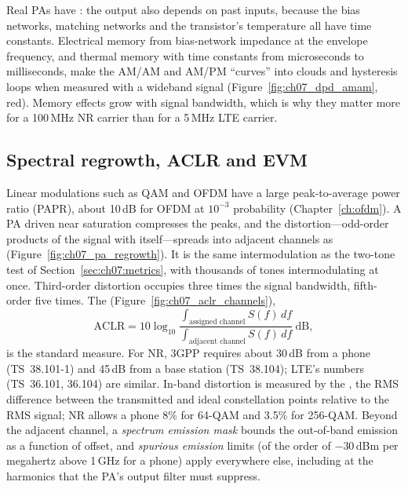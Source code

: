 Real PAs have : the output also depends on past inputs, because the bias networks, matching
networks and the transistor's temperature all have time constants. Electrical memory from bias-network
impedance at the envelope frequency, and thermal memory with time constants from microseconds to
milliseconds, make the AM/AM and AM/PM ``curves'' into clouds and hysteresis loops when measured with a
wideband signal (Figure~\ref{fig:ch07_dpd_amam}, red). Memory effects grow with signal bandwidth, which
is why they matter more for a 100\,MHz NR carrier than for a 5\,MHz LTE carrier.

\subsection{Spectral regrowth, ACLR and EVM}

Linear modulations such as QAM and OFDM have a large peak-to-average power ratio (PAPR), about 10\,dB
for OFDM at $10^{-3}$ probability (Chapter~\ref{ch:ofdm}). A PA driven near saturation compresses the peaks,
and the distortion---odd-order products of the signal with itself---spreads into adjacent channels as
 (Figure~\ref{fig:ch07_pa_regrowth}). It is the same intermodulation as the
two-tone test of Section~\ref{sec:ch07:metrics}, with thousands of tones intermodulating at once.
Third-order distortion occupies three times the signal bandwidth, fifth-order five times. The
 (Figure~\ref{fig:ch07_aclr_channels}),
\begin{equation}
\text{ACLR}=10\log_{10}\frac{\int_{\text{assigned channel}}S(f)\,df}{\int_{\text{adjacent channel}}S(f)\,df}\ \text{dB},
\end{equation}
is the standard measure. For NR, 3GPP requires about 30\,dB from a phone (TS~38.101-1) and 45\,dB from a
base station (TS~38.104); LTE's numbers (TS~36.101, 36.104) are similar. In-band distortion is measured by
the , the RMS difference between the transmitted and ideal constellation
points relative to the RMS signal; NR allows a phone 8\% for 64-QAM and 3.5\% for 256-QAM. Beyond the
adjacent channel, a \emph{spectrum emission mask} bounds the out-of-band emission as a function of
offset, and \emph{spurious emission} limits (of the order of $-30$\,dBm per megahertz above 1\,GHz for a
phone) apply everywhere else, including at the harmonics that the PA's output filter must suppress.


